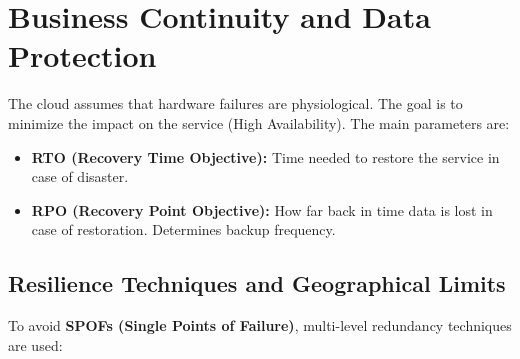 \section{Business Continuity and Data Protection}
The cloud assumes that hardware failures are physiological. The goal is to minimize the impact on the service (High Availability).
The main parameters are:
\begin{itemize}
    \item \textbf{RTO (Recovery Time Objective):} Time needed to restore the service in case of disaster.
    \item \textbf{RPO (Recovery Point Objective):} How far back in time data is lost in case of restoration. Determines backup frequency.
\end{itemize}

\subsection{Resilience Techniques and Geographical Limits}
To avoid \textbf{SPOFs (Single Points of Failure)}, multi-level redundancy techniques are used:
